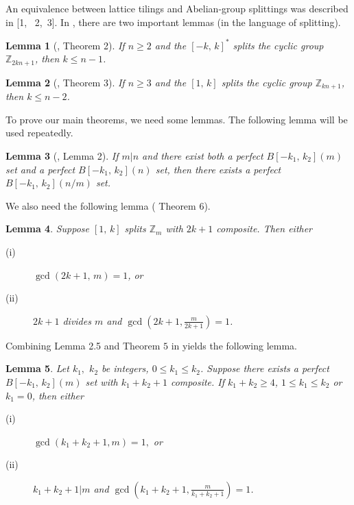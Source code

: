 \documentclass[12pt]{article}
\newtheorem{lem}{Lemma}[section]
\newtheorem{open problem}{Open problem}[section]
\begin{document}
An equivalence between lattice tilings and Abelian-group splittings was described in [1, \, 2, \,3]. In \cite{[SAT]}, there are two important lemmas (in the language of splitting).

\begin{lem}[\cite{[SAT]}, Theorem 2] \label{cross}
If $n\geq 2$ and the $[-k, \, k]^\ast$ splits the cyclic group $\mathbb{Z}_{2kn+1}$, then $k\leq n-1$.
\end{lem}

\begin{lem}[\cite{[SAT]}, Theorem 3] \label{semi-cross}
If $n\geq 3$ and the $[1, \, k]$ splits the cyclic group $\mathbb{Z}_{kn+1}$, then $k\leq n-2$.
\end{lem}

To prove our main theorems, we need some lemmas.
The following lemma will be used repeatedly.

\begin{lem}[\cite{[ZG]}, Lemma 2] \label{spec-cyclic}
If $m|n$ and there exist both a perfect $B[-k_1, \,k_2](m)$ set and a perfect $B[-k_1, \,k_2](n)$ set,
then there exists a perfect $B[-k_1, \,k_2](n/m)$ set.
\end{lem}


We also need the following lemma (\cite{[W]} Theorem 6).

\begin{lem} \label{gen-plus=n-1} Suppose $[1, \,k]$ splits $\mathbb{Z}_m$ with $2k + 1$ composite. Then either
\begin{description}
  \item[(i)] $\gcd(2k + 1, \,m) = 1$, or
  \item[(ii)] $2k + 1$ divides $m$ and $\gcd(2k + 1, \frac{m}{2k+1}) = 1$.
\end{description}

\end{lem}

Combining Lemma 2.5 \cite{[PK]} and  Theorem $5$ in \cite{[W]}  yields the following lemma.
\begin{lem} \label{gen-pk-lem}
Let $k_1,$ $k_2$ be integers, $0\leq k_1\leq k_2$. Suppose there exists a perfect $B[-k_1, \,k_2](m)$ set with $k_1 + k_2 + 1$ composite.
If $k_1+k_2\geq 4$, $1\leq k_1\leq k_2$ or $k_1=0$, then either
\begin{description}
  \item[(i)] $\gcd(k_1 + k_2 + 1,m) = 1,$ or
  \item[(ii)] $k_1 + k_2 + 1|m$ and $\gcd(k_1 + k_2 + 1, \frac{m}{k_1+k_2+1}) = 1$.
\end{description}
\end{lem}
\end{document}
